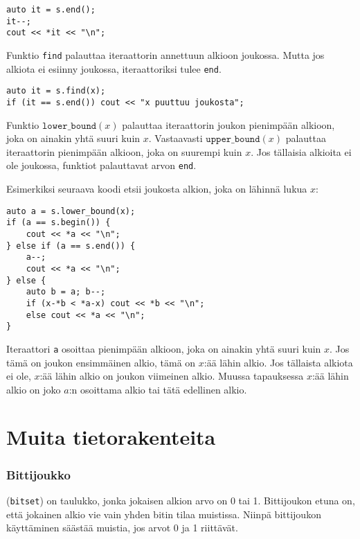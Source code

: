 \begin{lstlisting}
auto it = s.end();
it--;
cout << *it << "\n";
\end{lstlisting}

Funktio \texttt{find} palauttaa iteraattorin
annettuun alkioon joukossa.
Mutta jos alkiota ei esiinny joukossa,
iteraattoriksi tulee \texttt{end}.

\begin{lstlisting}
auto it = s.find(x);
if (it == s.end()) cout << "x puuttuu joukosta";
\end{lstlisting}

Funktio $\texttt{lower\_bound}(x)$ palauttaa
iteraattorin joukon pienimpään alkioon,
joka on ainakin yhtä suuri kuin $x$.
Vastaavasti $\texttt{upper\_bound}(x)$ palauttaa
iteraattorin pienimpään alkioon,
joka on suurempi kuin $x$.
Jos tällaisia alkioita ei ole joukossa,
funktiot palauttavat arvon \texttt{end}.

Esimerkiksi seuraava koodi etsii joukosta
alkion, joka on lähinnä lukua $x$:

\begin{lstlisting}
auto a = s.lower_bound(x);
if (a == s.begin()) {
    cout << *a << "\n";
} else if (a == s.end()) {
    a--;
    cout << *a << "\n";
} else {
    auto b = a; b--;
    if (x-*b < *a-x) cout << *b << "\n";
    else cout << *a << "\n";
}
\end{lstlisting}
Iteraattori \texttt{a}
osoittaa pienimpään alkioon,
joka on ainakin yhtä suuri kuin $x$.
Jos tämä on joukon ensimmäinen alkio,
tämä on $x$:ää lähin alkio.
Jos tällaista alkiota ei ole,
$x$:ää lähin alkio on joukon viimeinen alkio.
Muussa tapauksessa $x$:ää lähin alkio
on joko $a$:n osoittama alkio tai tätä edellinen alkio.

\section{Muita tietorakenteita}

\subsubsection{Bittijoukko}


 (\texttt{bitset}) on taulukko,
jonka jokaisen alkion arvo on 0 tai 1.
Bittijoukon etuna on, että jokainen alkio
vie vain yhden bitin tilaa muistissa.
Niinpä bittijoukon käyttäminen säästää muistia,
jos arvot 0 ja 1 riittävät.

